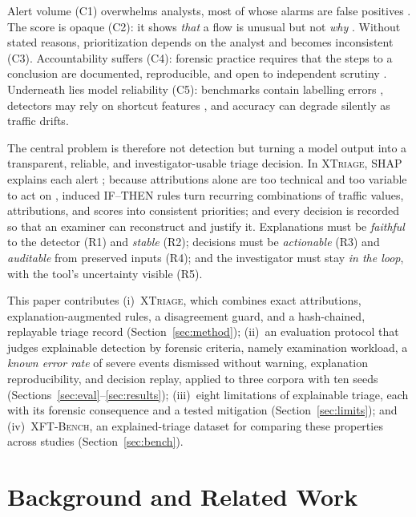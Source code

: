 \documentclass[journal]{IEEEtran}
\begin{document}
Alert volume (C1) overwhelms analysts, most of whose alarms are false positives \cite{alahmadi}. The score is opaque (C2): it shows \emph{that} a flow is unusual but not \emph{why} \cite{sommer}. Without stated reasons, prioritization depends on the analyst and becomes inconsistent (C3). Accountability suffers (C4): forensic practice requires that the steps to a conclusion are documented, reproducible, and open to independent scrutiny \cite{nist,iso27042}. Underneath lies model reliability (C5): benchmarks contain labelling errors \cite{engelen}, detectors may rely on shortcut features \cite{trustee,arp}, and accuracy can degrade silently as traffic drifts.

The central problem is therefore not detection but turning a model output into a transparent, reliable, and investigator-usable triage decision. In \textsc{XTriage}, SHAP explains each alert \cite{shap}; because attributions alone are too technical and too variable to act on \cite{warnecke}, induced IF--THEN rules turn recurring combinations of traffic values, attributions, and scores into consistent priorities; and every decision is recorded so that an examiner can reconstruct and justify it. Explanations must be \emph{faithful} to the detector (R1) and \emph{stable} (R2); decisions must be \emph{actionable} (R3) and \emph{auditable} from preserved inputs (R4); and the investigator must stay \emph{in the loop}, with the tool's uncertainty visible (R5).

This paper contributes (i)~\textsc{XTriage}, which combines exact attributions, explanation-augmented rules, a disagreement guard, and a hash-chained, replayable triage record (Section~\ref{sec:method}); (ii)~an evaluation protocol that judges explainable detection by forensic criteria, namely examination workload, a \emph{known error rate} of severe events dismissed without warning, explanation reproducibility, and decision replay, applied to three corpora with ten seeds (Sections~\ref{sec:eval}--\ref{sec:results}); (iii)~eight limitations of explainable triage, each with its forensic consequence and a tested mitigation (Section~\ref{sec:limits}); and (iv)~\textsc{XFT-Bench}, an explained-triage dataset for comparing these properties across studies (Section~\ref{sec:bench}).

\section{Background and Related Work}
\label{sec:related}
\end{document}
